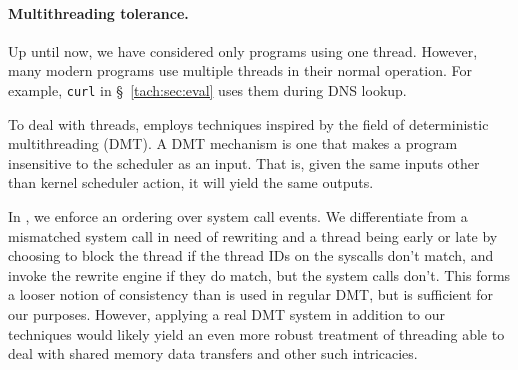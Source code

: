 \paragraph{Multithreading tolerance.}
\label{tach:sec:multi}

Up until now, we have considered only programs using one
thread. However, many modern programs use multiple threads in their
normal operation. For example, \texttt{curl} in \S~\ref{tach:sec:eval} uses them during DNS
lookup.

To deal with threads, \tachyon employs techniques inspired by the field of
deterministic multithreading (DMT)\cite{coredet, determinator,
  dthreads}.  A DMT mechanism is one that makes a program insensitive
to the scheduler as an input. That is, given the same inputs other
than kernel scheduler action, it will yield the same outputs. 

In \tachyon, we enforce an ordering over system call events.
We differentiate from a mismatched system call in need of rewriting and a thread
being early or late by choosing to block the thread if the thread IDs on the syscalls don't match,
and invoke the rewrite engine if they do match, but the system calls don't.
This forms a looser notion of consistency than is used in regular DMT, but is sufficient for our purposes.
However, applying a real DMT system in addition to our techniques
would likely yield an even more robust treatment of threading able to deal with shared memory
data transfers and other such intricacies.
